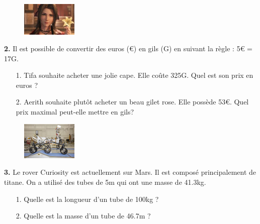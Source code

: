 \Pointilles[6]

\newpage

\begin{minipage}[t]{0.25\textwidth}
  \begin{figure}[H]
    \centering
    \includegraphics[width=100px]{4x3-proportionnalite/ex2.jpg}
  \end{figure}
\end{minipage}
\begin{minipage}[t]{0.75\textwidth}
\textbf{2.} Il est possible de convertir des euros (€) en gils (G) en suivant la règle : 5€ = 17G.

\begin{enumerate}
  \item[1.] Tifa souhaite acheter une jolie cape. Elle coûte 325G. Quel est son prix en euros ? 
  \item[2.] Aerith souhaite plutôt acheter un beau gilet rose. Elle possède 53€. Quel prix maximal peut-elle mettre en gils?
\end{enumerate}

\Pointilles[1]
\end{minipage}

\Pointilles[7]

\begin{minipage}[t]{0.25\textwidth}
  \begin{figure}[H]
    \centering
    \includegraphics[width=100px]{4x3-proportionnalite/ex3.jpg}
  \end{figure}
\end{minipage}
\begin{minipage}[t]{0.75\textwidth}
\textbf{3.} Le rover Curiosity est actuellement sur Mars. Il est composé principalement de titane. On a utilisé des tubes de 5m qui ont une masse de 41.3kg. 

\begin{enumerate}
  \item[1.] Quelle est la longueur d'un tube de 100kg ?
  \item[2.] Quelle est la masse d'un tube de 46.7m ? 
\end{enumerate}

\Pointilles[3]
\end{minipage}


